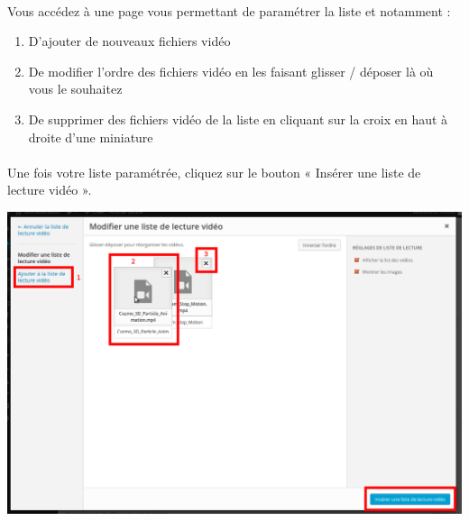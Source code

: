 \documentclass[10pt,a4paper]{article}
\begin{document}
\paragraph{}Vous accédez à une page vous permettant de paramétrer la liste et notamment :
\begin{enumerate}
\item D'ajouter de nouveaux fichiers vidéo
\item De modifier l'ordre des fichiers vidéo en les faisant glisser / déposer là où vous le souhaitez
\item De supprimer des fichiers vidéo de la liste en cliquant sur la croix en haut à droite d'une miniature
\end{enumerate}
\paragraph{}Une fois votre liste paramétrée, cliquez sur le bouton « Insérer une liste de lecture vidéo ».
\begin{center}
\includegraphics[scale=0.25]{img/0130.png}
\end{center}
\end{document}
